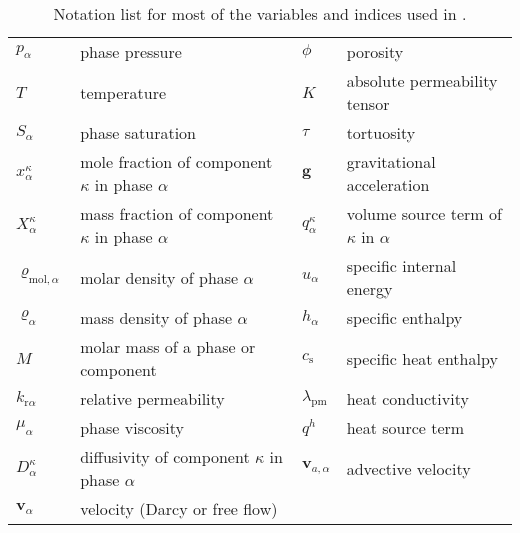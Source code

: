 \begin{table}
\begin{tabular}{llll}
$p_\alpha$ & phase pressure & $\phi$ & porosity \\
$T$ & temperature & $K$ & absolute permeability tensor \\
$S_\alpha$ & phase saturation & $\tau$ & tortuosity \\
$x_\alpha^\kappa$ & mole fraction of component $\kappa$ in phase $\alpha$ & $\boldsymbol{g}$ & gravitational acceleration \\
$X_\alpha^\kappa$ & mass fraction of component $\kappa$ in phase $\alpha$ & $q^\kappa_\alpha$ & volume source term of $\kappa$ in $\alpha$ \\
$\varrho_{\text{mol},\alpha}$ & molar density of phase $\alpha$ & $u_\alpha$ & specific internal energy \\
$\varrho_{\alpha}$ & mass density of phase $\alpha$ & $h_\alpha$ & specific enthalpy \\
$M$ & molar mass of a phase or component & $c_\text{s}$ & specific heat enthalpy \\
$k_{\text{r}\alpha}$ & relative permeability & $\lambda_\text{pm}$ & heat conductivity \\
$\mu_\alpha$ & phase viscosity & $q^h$ & heat source term \\
$D_\alpha^\kappa$ & diffusivity of component $\kappa$ in phase $\alpha$ & $\boldsymbol{v}_{a,\alpha}$  & advective velocity \\
$\boldsymbol{v}_\alpha$ & velocity (Darcy or free flow)& & \\
\end{tabular}
\caption{Notation list for most of the variables and indices used in \Dumux.}
\end{table}

